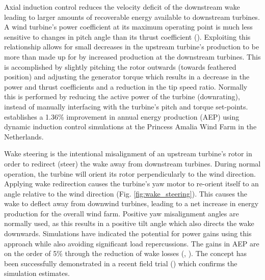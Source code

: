 Axial induction control reduces the velocity deficit of the downstream wake leading to larger amounts of recoverable energy available to downstream turbines. A wind turbine's power coefficient at its maximum operating point is much less sensitive to changes in pitch angle than its thrust coefficient (\cite{annoni_analysis_2016}). Exploiting this relationship allows for small decreases in the upstream turbine's production to be more than made up for by increased production at the downstream turbines. This is accomplished by slightly pitching the rotor outwards (towards feathered position) and adjusting the generator torque which results in a decrease in the power and thrust coefficients and a reduction in the tip speed ratio. Normally this is performed by reducing the active power of the turbine (downrating), instead of manually interfacing with the turbine's pitch and torque set-points. \cite{gebraad_maximum_2015} establishes a 1.36\% improvement in annual energy production (AEP) using dynamic induction control simulations at the Princess Amalia Wind Farm in the Netherlands.

Wake steering is the intentional misalignment of an upstream turbine's rotor in order to redirect (steer) the wake away from downstream turbines. During normal operation, the turbine will orient its rotor perpendicularly to the wind direction. Applying wake redirection causes the turbine's yaw motor to re-orient itself to an angle relative to the wind direction (Fig. \ref{fig:wake_steering}). This causes the wake to deflect away from downwind turbines, leading to a net increase in energy production for the overall wind farm. Positive yaw misalignment angles are normally used, as this results in a positive tilt angle which also directs the wake downwards. Simulations have indicated the potential for power gains using this approach while also avoiding significant load repercussions. The gains in AEP are on the order of 5\% through the reduction of wake losses (\cite{knudsen_survey_2015}, \cite{gebraad_maximization_2017}). The concept has been successfully demonstrated in a recent field trial (\cite{fleming_field_2017}) which confirms the simulation estimates.

